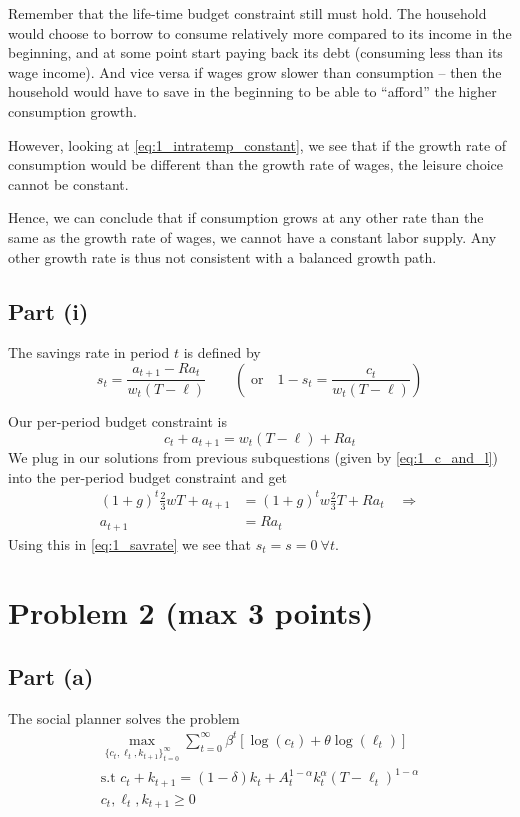 \documentclass{scrartcl}
\newcommand{\lep}{\left(}
\newcommand{\rip}{\right)}
\newcommand{\leh}{\left[}
\newcommand{\rih}{\right]}
\begin{document}
Remember that the life-time budget constraint still must hold. The household would choose to borrow to consume relatively more compared to its income in the beginning, and at some point start paying back its debt (consuming less than its wage income). And vice versa if wages grow slower than consumption -- then the household would have to save in the beginning to be able to ``afford'' the higher consumption growth. 

However, looking at \eqref{eq:1_intratemp_constant}, we see that if the growth rate of consumption would be different than the growth rate of wages, the leisure choice cannot be constant. 

Hence, we can conclude that if consumption grows at any other rate than the same as the growth rate of wages, we cannot have a constant labor supply. Any other growth rate is thus not consistent with a balanced growth path. 

\subsection*{Part (i)}
The savings rate in period $t$ is defined by
\begin{equation}
	s_t = \frac{a_{t+1} - Ra_t}{w_t(T-\ell)} 
	\qquad \lep \text{ or} \quad
	1-s_t = \frac{c_t}{w_t(T-\ell)} \rip \label{eq:1_savrate}
\end{equation}

Our per-period budget constraint is 
\begin{equation*}
	c_t + a_{t+1} = w_t(T-\ell) + Ra_t
\end{equation*}
We plug in our solutions from previous subquestions (given by \eqref{eq:1_c_and_l}) into the per-period budget constraint and get
\begin{align*}
	(1+g)^t\frac{2}{3}wT + a_{t+1} &= (1+g)^t w \frac{2}{3}T + Ra_t \quad \Rightarrow \\
	a_{t+1} &= Ra_t
\end{align*}
Using this in \eqref{eq:1_savrate} we see that $s_t = s = 0 ~ \forall t$. 

\section*{Problem 2 (max 3 points)}

\subsection*{Part (a)}
The social planner solves the problem 
\begin{gather*}
	\max_{\{c_t, \ell_t, k_{t+1}\}_{t=0}^{\infty}} 
	\sum_{t=0}^{\infty} \beta^t \leh \log (c_t) + \theta \log (\ell_t) \rih \\
	\text{s.t } c_t + k_{t+1} = (1-\delta)k_t + A_t^{1-\alpha} k_t^\alpha (T-\ell_t)^{1-\alpha} \\
	c_t, \ell_t, k_{t+1} \geq 0
\end{gather*}
\end{document}
